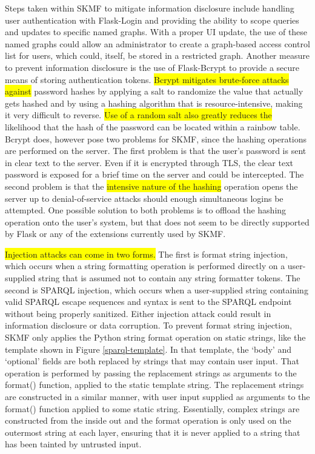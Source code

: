 Steps taken within SKMF to mitigate information disclosure include handling user authentication with Flask-Login and providing the ability to scope queries and updates to specific named graphs. With a proper UI update, the use of these named graphs could allow an administrator to create a graph-based access control list for users, which could, itself, be stored in a restricted graph. Another measure to prevent information disclosure is the use of Flask-Bcrypt to provide a secure means of storing authentication tokens.
\colorbox{yellow}{Bcrypt mitigates brute-force attacks against}
password hashes by applying a salt to randomize the value that actually gets hashed and by using a hashing algorithm that is resource-intensive, making it very difficult to reverse. \colorbox{yellow}{Use of a random salt also greatly reduces the}
likelihood that the hash of the password can be located within a rainbow table. Bcrypt does, however pose two problems for SKMF, since the hashing operations are performed on the server. The first problem is that the user's password is sent in clear text to the server. Even if it is encrypted through TLS, the clear text password is exposed for a brief time on the server and could be intercepted. The second problem is that the
\colorbox{yellow}{intensive nature of the hashing}
operation opens the server up to denial-of-service attacks should enough simultaneous logins be attempted. One possible solution to both problems is to offload the hashing operation onto the user's system, but that does not seem to be directly supported by Flask or any of the extensions currently used by SKMF.

\colorbox{yellow}{Injection attacks can come in two forms.}
The first is format string injection, which occurs when a string formatting operation is performed directly on a user-supplied string that is assumed not to contain any string formatter tokens. The second is SPARQL injection, which occurs when a user-supplied string containing valid SPARQL escape sequences and syntax is sent to the SPARQL endpoint without being properly sanitized. Either injection attack could result in information disclosure or data corruption. To prevent format string injection, SKMF only applies the Python string format operation on static strings, like the template shown in Figure
\ref{sparql-template}.
In that template, the `body' and `optional' fields are both replaced by strings that may contain user input. That operation is performed by passing the replacement strings as arguments to the format() function, applied to the static template string. The replacement strings are constructed in a similar manner, with user input supplied as arguments to the format() function applied to some static string. Essentially, complex strings are constructed from the inside out and the format operation is only used on the outermost string at each layer, ensuring that it is never applied to a string that has been tainted by untrusted input.

